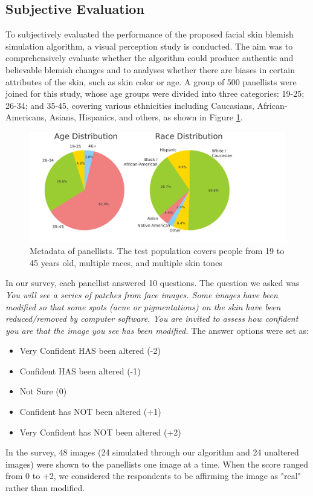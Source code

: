 \begin{spacing}{1.5}
\subsection{Subjective Evaluation}
To subjectively evaluated the performance of the proposed facial skin blemish simulation algorithm, a visual perception study is conducted. The aim was to comprehensively evaluate whether the algorithm could produce authentic and believable blemish changes and to analyses whether there are biases in certain attributes of the skin, such as skin color or age. A group of 500 panellists were joined for this study, whose age groups were divided into three categories: 19-25; 26-34; and 35-45, covering various ethnicities including Caucasians, African-Americans, Asians, Hispanics, and others, as shown in Figure \ref{fig:metadata}.
\begin{figure}[t!]
    \includegraphics[width=0.95\columnwidth]{Chapter4/metadata.pdf}
    \caption{Metadata of panellists. The test population covers people from 19 to 45 years old, multiple races, and multiple skin tones}
    \label{fig:metadata}
\end{figure} 
In our survey, each panellist answered 10 questions. The question we asked was \textit{You will see a series of patches from face images. Some images have been modified so that some spots (acne or pigmentations) on the skin have been reduced/removed by computer software. You are invited to assess how confident you are that the image you see has been modified.} The answer options were set as:
\begin{itemize}
    \item Very Confident HAS been altered (-2)
    \item Confident HAS been altered (-1)
    \item Not Sure (0)
    \item Confident has NOT been altered (+1)
    \item Very Confident has NOT been altered (+2)
\end{itemize}

In the survey, 48 images (24 simulated through our algorithm and 24 unaltered images) were shown to the panellists one image at a time. When the score ranged from 0 to +2, we considered the respondents to be affirming the image as "real" rather than modified.

\end{spacing}
\newpage
